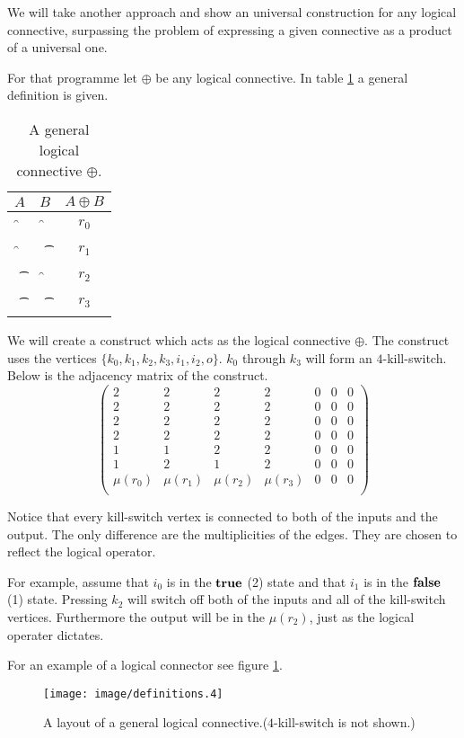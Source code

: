 We will take another approach and show an universal construction for any
logical connective, surpassing the problem of expressing a given
connective as a product of a universal one.

For that programme let $\oplus$ be any logical connective. In table
\ref{table:oplus} a general definition is given.
\begin{table}
	\begin{center}
		\begin{tabular}{c|c|c}
			$A$ & $B$ & $A \oplus B$ \\
			\hline
			\f & \f & $r_{0}$ \\
			\f & \t & $r_{1}$ \\
			\t & \f & $r_{2}$ \\
			\t & \t & $r_{3}$ \\
		\end{tabular}
	\end{center}
	\caption{A general logical connective $\oplus$.}\label{table:oplus} 
\end{table}

We will create a construct which acts as the logical connective
$\oplus$. The construct uses the vertices 
$\{k_{0}, k_{1}, k_{2}, k_{3}, i_{1}, i_{2}, o \}$. $k_{0}$ through $k_{3}$ will
form an $4$-kill-switch. Below is the adjacency matrix of the construct. 
\[
	\left(
	\begin{array}{ccccccc}
		2 & 2 & 2 & 2 & 0 & 0 & 0 \\
		2 & 2 & 2 & 2 & 0 & 0 & 0 \\
		2 & 2 & 2 & 2 & 0 & 0 & 0 \\
		2 & 2 & 2 & 2 & 0 & 0 & 0 \\
		1 & 1 & 2 & 2 & 0 & 0 & 0 \\
		1 & 2 & 1 & 2 & 0 & 0 & 0 \\
		\mu(r_{0}) & \mu(r_{1}) & \mu(r_{2}) & \mu(r_{3}) & 0 & 0 & 0 \\
	\end{array}
	\right)
\]

Notice that every kill-switch vertex is connected to both of the inputs and the
output. The only difference are the multiplicities of the edges. They are chosen
to reflect the logical operator.

For example, assume that $i_{0}$ is in the $\text{\bf true}$ (2) state and that $i_{1}$ is in
the ${\text{\bf false}}$ (1) state. Pressing $k_{2}$ will switch off both of the inputs and all 
of the kill-switch vertices. Furthermore the output will be in the $\mu(r_{2})$,
just as the logical operater dictates. 

For an example of a logical connector see figure
\ref{figure:connective}. 
\begin{figure}
	\begin{center}
		\texttt{[image: image/definitions.4]}
	\end{center}
	\caption{A layout of a general logical connective.($4$-kill-switch is not shown.)}\label{figure:connective}
\end{figure}
